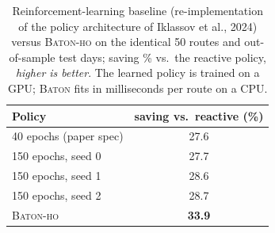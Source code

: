 \begin{table}[t]
\caption{Reinforcement-learning baseline (re-implementation of the policy
architecture of Iklassov et al., 2024) versus \textsc{Baton-ho} on the
identical 50 routes and out-of-sample test days; saving \% vs.\ the
reactive policy, \emph{higher is better}. The learned policy is
trained on a GPU; \textsc{Baton} fits in milliseconds per route on a CPU.}
\label{tab:rl}
\centering
\begin{tabular}{l c}
\toprule
Policy & saving vs.\ reactive (\%) \\
\midrule
40 epochs (paper spec) & 27.6 \\
150 epochs, seed 0 & 27.7 \\
150 epochs, seed 1 & 28.6 \\
150 epochs, seed 2 & 28.7 \\
\midrule
\textsc{Baton-ho} & \textbf{33.9} \\
\bottomrule
\end{tabular}
\end{table}
